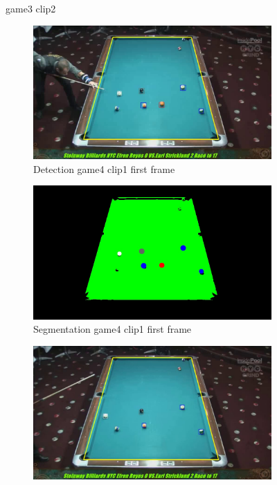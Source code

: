 \begin{figure}[H]
	\caption{game3 clip2}
\end{figure}

\begin{figure}[H]
	\centering
	\begin{subfigure}[b]{0.48\textwidth}
		\centering
		\includegraphics[width=\textwidth]{images/Detection/game4_clip1_detected_balls_first_frame.jpg}
		\caption{Detection game4 clip1 first frame}
		\label{fig: game4_clip1_first_frame_detected}
	\end{subfigure}
	\begin{subfigure}[b]{0.48\textwidth}
		\centering
		\includegraphics[width=\textwidth]{images/Segmentation/game4_clip1_segmented_balls_first_frame.jpg}
		\caption{Segmentation game4 clip1 first frame}
		\label{fig: game4_clip1_first_frame_segmented}
	\end{subfigure}
	\begin{subfigure}[b]{0.48\textwidth}
		\centering
		\includegraphics[width=\textwidth]{images/Detection/game4_clip1_detected_balls_last_frame.jpg}

\end{subfigure}
\end{figure}
